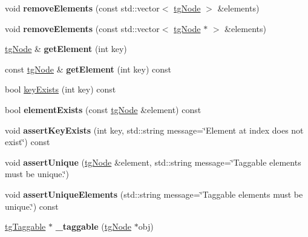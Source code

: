 \begin{DoxyCompactItemize}
\item 
\hypertarget{classtg_taggables_a5539a39d29b42ce2770b106cd7ddd38e}{void {\bfseries remove\-Elements} (const std\-::vector$<$ \hyperlink{classtg_node}{tg\-Node} $>$ \&elements)}\label{classtg_taggables_a5539a39d29b42ce2770b106cd7ddd38e}

\item 
\hypertarget{classtg_taggables_a83f364ebce003fbaad9672c7f5a50847}{void {\bfseries remove\-Elements} (const std\-::vector$<$ \hyperlink{classtg_node}{tg\-Node} $\ast$ $>$ \&elements)}\label{classtg_taggables_a83f364ebce003fbaad9672c7f5a50847}

\item 
\hypertarget{classtg_taggables_a579393f46ed07b0620987ebdcc50bd25}{\hyperlink{classtg_node}{tg\-Node} \& {\bfseries get\-Element} (int key)}\label{classtg_taggables_a579393f46ed07b0620987ebdcc50bd25}

\item 
\hypertarget{classtg_taggables_a35830f2d7f865f692f8abd529ba93d0f}{const \hyperlink{classtg_node}{tg\-Node} \& {\bfseries get\-Element} (int key) const}\label{classtg_taggables_a35830f2d7f865f692f8abd529ba93d0f}

\item 
bool \hyperlink{classtg_taggables_ac2922a09a3b3885c8f6f4d0c97b247a9}{key\-Exists} (int key) const
\item 
\hypertarget{classtg_taggables_a54045c97e415be9bc8422b0e100b6fee}{bool {\bfseries element\-Exists} (const \hyperlink{classtg_node}{tg\-Node} \&element) const}\label{classtg_taggables_a54045c97e415be9bc8422b0e100b6fee}

\item 
\hypertarget{classtg_taggables_aebe6b45ca9d42a229224616c54460161}{void {\bfseries assert\-Key\-Exists} (int key, std\-::string message=\char`\"{}Element at index does not exist\char`\"{}) const}\label{classtg_taggables_aebe6b45ca9d42a229224616c54460161}

\item 
\hypertarget{classtg_taggables_a2428d80a02f7344ac146710f1c4222d1}{void {\bfseries assert\-Unique} (\hyperlink{classtg_node}{tg\-Node} \&element, std\-::string message=\char`\"{}Taggable elements must be unique.\char`\"{})}\label{classtg_taggables_a2428d80a02f7344ac146710f1c4222d1}

\item 
\hypertarget{classtg_taggables_abb1aa6daab7d692173a9f9c2f84e39a7}{void {\bfseries assert\-Unique\-Elements} (std\-::string message=\char`\"{}Taggable elements must be unique.\char`\"{}) const}\label{classtg_taggables_abb1aa6daab7d692173a9f9c2f84e39a7}

\item 
\hypertarget{classtg_taggables_a0188b2313dad65b78fad978c6a25d015}{\hyperlink{classtg_taggable}{tg\-Taggable} $\ast$ {\bfseries \-\_\-taggable} (\hyperlink{classtg_node}{tg\-Node} $\ast$obj)}\label{classtg_taggables_a0188b2313dad65b78fad978c6a25d015}

\end{DoxyCompactItemize}
